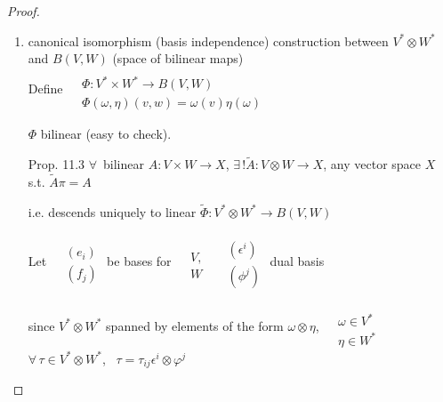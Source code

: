 \documentclass[11pt]{amsart}
\theoremstyle{definition}
\begin{document}
\begin{proof}
\begin{enumerate}
\item[(a)] canonical isomorphism (basis independence) construction between $V^* \otimes W^*$ and $B(V,W)$ (space of bilinear maps) \\

Define $\begin{aligned} & \quad \\
  & \Phi : V^* \times W^* \to B(V,W) \\
  & \Phi(\omega, \eta)(v,w) = \omega(v) \eta(\omega) \end{aligned}$

$\Phi$ bilinear (easy to check).

Prop. 11.3  $\forall \, $ bilinear $A: V\times W \to X$, $\exists \, ! \widetilde{A} : V\otimes W \to X$, any vector space $X$ s.t. $\widetilde{A} \pi = A$


i.e. descends uniquely to linear $\widetilde{\Phi} : V^* \otimes W^* \to B(V,W)$

Let $\begin{aligned} & \quad \\
  & (e_i) \\
  & (f_j) \end{aligned}$ be bases for $\begin{aligned} & \quad \\
  & V, \\
  & W \end{aligned}$ \quad $\begin{aligned} & \quad \\
  & (\epsilon^i) \\
  & (\phi^j) \end{aligned}$ \quad dual basis

since $V^* \otimes W^*$ spanned by elements of the form $\omega \otimes \eta$, $\begin{aligned} & \quad \\ & \omega \in V^* \\
 & \eta \in W^* \end{aligned}$ \\
$\forall \, \tau \in V^* \otimes W^*$, \, $\tau = \tau_{ij} \epsilon^i \otimes \varphi^j $


\end{enumerate}
\end{proof}
\end{document}
